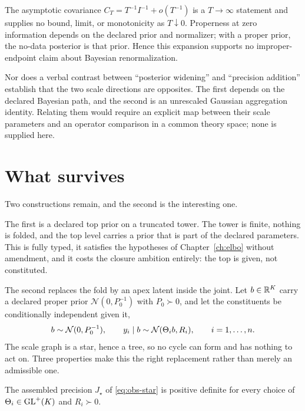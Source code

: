 The asymptotic covariance
\(C_T=T^{-1}I^{-1}+o(T^{-1})\) is a \(T\to\infty\) statement and supplies
no bound, limit, or monotonicity as \(T\downarrow0\). Properness at zero
information depends on the declared prior and normalizer; with a proper
prior, the no-data posterior is that prior. Hence this expansion supports
no improper-endpoint claim about Bayesian renormalization.

Nor does a verbal contrast between ``posterior widening'' and ``precision addition'' establish that the two scale directions are opposites. The first depends on the declared Bayesian path, and the second is an unrescaled Gaussian aggregation identity. Relating them would require an explicit map between their scale parameters and an operator comparison in a common theory space; none is supplied here. 

\section{What survives}
\label{sec:obs-survives}

Two constructions remain, and the second is the interesting one.

The first is a declared top prior on a truncated tower. The tower is finite, nothing is folded, and the top level carries a prior that is part of the declared parameters. This is fully typed, it satisfies the hypotheses of Chapter~\ref{ch:elbo} without amendment, and it costs the closure ambition entirely: the top is given, not constituted.

The second replaces the fold by an apex latent inside the joint. Let $b\in\mathbb R^{K}$ carry a declared proper prior $\mathcal N(0,P_0^{-1})$ with $P_0\succ0$, and let the constituents be conditionally independent given it,
\begin{equation}
b\sim\mathcal N(0,P_0^{-1}),
\qquad
y_i\mid b\sim\mathcal N(\Theta_i b, R_i),
\qquad
i=1,\dots,n .
\label{eq:obs-star}
\end{equation}
The scale graph is a star, hence a tree, so no cycle can form and  has nothing to act on. Three properties make this the right replacement rather than merely an admissible one.

The assembled precision $J_\star$ of \eqref{eq:obs-star} is positive definite for every choice of $\Theta_i\in\mathrm{GL}^{+}(K)$ and $R_i\succ0$.

